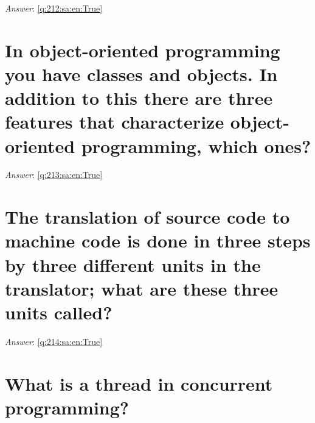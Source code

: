 \documentclass[a4paper,11pt,oneside]{book}
\begin{document}
\begin{sloppypar}
\label{q:212:sa:en:False}

\vspace{2cm}

\noindent\makebox[\textwidth]{\hrulefill}

\vspace{1cm}

\textit{Answer}: \autoref{q:212:sa:en:True}



\section{In object-oriented programming you have classes and objects. In addition to this there are three features that characterize object-oriented programming, which ones?}

\label{q:213:sa:en:False}

\vspace{2cm}

\noindent\makebox[\textwidth]{\hrulefill}

\vspace{1cm}

\textit{Answer}: \autoref{q:213:sa:en:True}



\section{The translation of source code to machine code is done in three steps by three different units in the translator; what are these three units called?}

\label{q:214:sa:en:False}

\vspace{2cm}

\noindent\makebox[\textwidth]{\hrulefill}

\vspace{1cm}

\textit{Answer}: \autoref{q:214:sa:en:True}



\section{What is a thread in concurrent programming?}

\label{q:215:sa:en:False}

\vspace{2cm}

\noindent\makebox[\textwidth]{\hrulefill}


\end{sloppypar}
\end{document}
